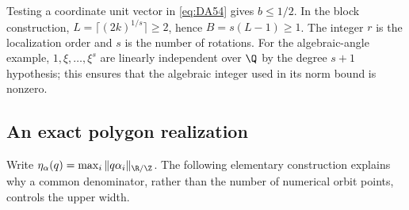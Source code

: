 \begin{remark}
Testing a coordinate unit vector in \eqref{eq:DA54} gives $b\le1/2$. In the block construction, $L=\lceil(2k)^{1/s}\rceil\ge2$, hence $B=s(L-1)\ge1$. The integer $r$ is the localization order and $s$ is the number of rotations. For the algebraic-angle example, $1,\xi,\ldots,\xi^s$ are linearly independent over $\Q$ by the degree $s+1$ hypothesis; this ensures that the algebraic integer used in its norm bound is nonzero.
\end{remark}

\subsection{An exact polygon realization}
Write $\eta_\alpha(q)=\max_i\|q\alpha_i\|_{\R/\Z}$. The following elementary construction explains why a common denominator, rather than the number of numerical orbit points, controls the upper width.


